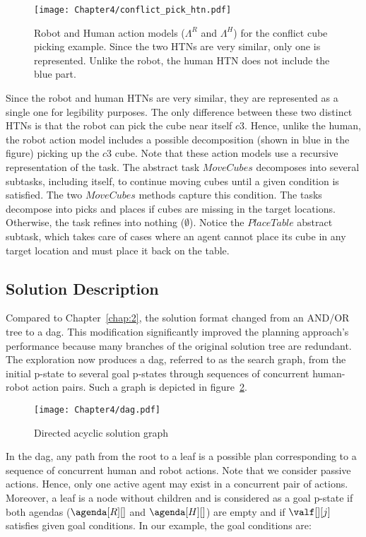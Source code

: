 \begin{figure}[h]
    \center
    \texttt{[image: Chapter4/conflict\_pick\_htn.pdf]}
    \caption{Robot and Human action models ($\Lambda^R$ and $\Lambda^H$) for the conflict cube picking example. Since the two HTNs are very similar, only one is represented. Unlike the robot, the human HTN does not include the blue part.}
    \label{fig:conflict_pick_htn}
\end{figure}

Since the robot and human HTNs are very similar, they are represented as a single one for legibility purposes. The only difference between these two distinct HTNs is that the robot can pick the cube near itself $c3$. Hence, unlike the human, the robot action model includes a possible decomposition (shown in blue in the figure) picking up the $c3$ cube. Note that these action models use a recursive representation of the task. The abstract task $MoveCubes$ decomposes into several subtasks, including itself, to continue moving cubes until a given condition is satisfied. The two $MoveCubes$ methods capture this condition. The tasks decompose into picks and places if cubes are missing in the target locations. Otherwise, the task refines into nothing ($\emptyset$). Notice the $PlaceTable$ abstract subtask, which takes care of cases where an agent cannot place its cube in any target location and must place it back on the table. 

\subsection*{Solution Description}

Compared to Chapter~\ref{chap:2}, the solution format changed from an AND/OR tree to a \acrfull{dag}. This modification significantly improved the planning approach's performance because many branches of the original solution tree are redundant. The exploration now produces a \acrfull{dag}, referred to as the search graph, from the initial p-state to several goal p-states through sequences of concurrent human-robot action pairs. Such a graph is depicted in figure~\ref{fig:dag}. 

\begin{figure}[h]
    \centering
    \texttt{[image: Chapter4/dag.pdf]}
    \caption{Directed acyclic solution graph}
    \label{fig:dag}
\end{figure}

In the \acrshort{dag}, any path from the root to a leaf is a possible plan corresponding to a sequence of concurrent human and robot actions. Note that we consider passive actions. Hence, only one active agent may exist in a concurrent pair of actions. Moreover, a leaf is a node without children and is considered as a goal p-state if both agendas ($\agenda[R][]$ and $\agenda[H][]$) are empty and if $\valf[][j]$ satisfies given goal conditions. In our example, the goal conditions are:


